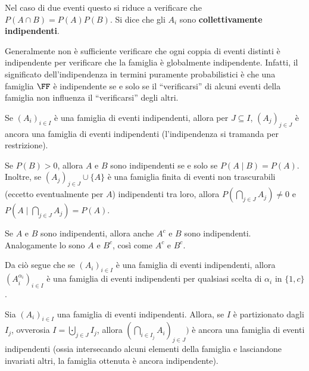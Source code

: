 \begin{multicols*}{2}
\begin{definition}
        Nel caso di due eventi questo si riduce a verificare
        che $P(A \cap B) = P(A) P(B)$. Si dice che gli $A_i$ sono
        \textbf{collettivamente indipendenti}.
    \end{definition}

    \begin{remark}
        Generalmente non è sufficiente verificare che ogni coppia di eventi distinti è
        indipendente per verificare che la famiglia è globalmente indipendente.
        Infatti, il significato dell'indipendenza in termini puramente probabilistici
        è che una famiglia $\FF$ è indipendente se e solo se il ``verificarsi'' di
        alcuni eventi della famiglia non influenza il ``verificarsi'' degli altri.
    \end{remark}

    \begin{remark}
        Se $(A_i)_{i \in I}$ è una famiglia di eventi indipendenti, allora
        per $J \subseteq I$, $(A_j)_{j \in J}$ è ancora una famiglia di
        eventi indipendenti (l'indipendenza si tramanda per restrizione).
    \end{remark}

    \begin{proposition}
        Se $P(B) > 0$, allora $A$ e $B$ sono indipendenti se
        e solo se $P(A \mid B) = P(A)$. Inoltre, se
        $(A_j)_{j \in J} \cup \{A\}$ è una famiglia finita di eventi
        non trascurabili (eccetto eventualmente per $A$)
        indipendenti tra loro, allora
        $P(\bigcap_{j \in J} A_j) \neq 0$ e
        $P(A \mid \bigcap_{j \in J} A_j) = P(A)$.
    \end{proposition}

    \begin{proposition}
        Se $A$ e $B$ sono indipendenti, allora anche
        $A^c$ e $B$ sono indipendenti. Analogamente
        lo sono $A$ e $B^c$, così come
        $A^c$ e $B^c$.


        Da ciò segue che se $(A_i)_{i \in I}$ è una famiglia di eventi
        indipendenti, allora $(A_i^{\alpha_i})_{i \in I}$ è una famiglia
        di eventi indipendenti per qualsiasi scelta di $\alpha_i$ in
        $\{1, c\}$.
    \end{proposition}

    \begin{proposition}
        Sia $(A_i)_{i \in I}$ una famiglia di eventi indipendenti. Allora,
        se $I$ è partizionato dagli $I_j$, ovverosia $I = \bigcupdot_{j \in J} I_j$,
        allora $(\bigcap_{i \in I_j} A_{i})_{j \in J})$ è ancora una famiglia
        di eventi indipendenti (ossia intersecando alcuni elementi della famiglia
        e lasciandone invariati altri, la famiglia ottenuta è ancora indipendente).
    \end{proposition}


\end{multicols*}
